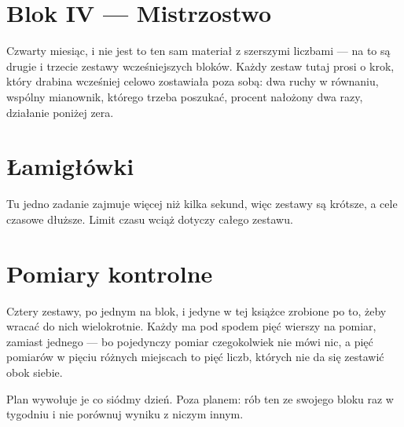 

\chapter{Blok IV — Mistrzostwo}

Czwarty miesiąc, i nie jest to ten sam materiał z szerszymi liczbami — na to
są drugie i trzecie zestawy wcześniejszych bloków. Każdy zestaw tutaj prosi
o krok, który drabina wcześniej celowo zostawiała poza sobą: dwa ruchy
w równaniu, wspólny mianownik, którego trzeba poszukać, procent nałożony dwa
razy, działanie poniżej zera.



\chapter{Łamigłówki}

Tu jedno zadanie zajmuje więcej niż kilka sekund, więc zestawy są krótsze,
a cele czasowe dłuższe. Limit czasu wciąż dotyczy całego zestawu.



\chapter{Pomiary kontrolne}

Cztery zestawy, po jednym na blok, i jedyne w tej książce zrobione po to, żeby
wracać do nich wielokrotnie. Każdy ma pod spodem pięć wierszy na pomiar,
zamiast jednego — bo pojedynczy pomiar czegokolwiek nie mówi nic, a pięć
pomiarów w pięciu różnych miejscach to pięć liczb, których nie da się
zestawić obok siebie.

Plan wywołuje je co siódmy dzień. Poza planem: rób ten ze swojego bloku raz
w tygodniu i nie porównuj wyniku z niczym innym.


